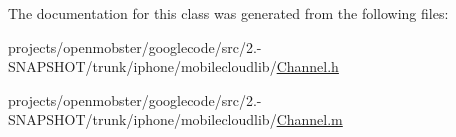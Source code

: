 \-The documentation for this class was generated from the following files\-:\begin{DoxyCompactItemize}
\item 
projects/openmobster/googlecode/src/2.-\/\-S\-N\-A\-P\-S\-H\-O\-T/trunk/iphone/mobilecloudlib/\hyperlink{_channel_8h}{\-Channel.\-h}\item 
projects/openmobster/googlecode/src/2.-\/\-S\-N\-A\-P\-S\-H\-O\-T/trunk/iphone/mobilecloudlib/\hyperlink{_channel_8m}{\-Channel.\-m}\end{DoxyCompactItemize}
